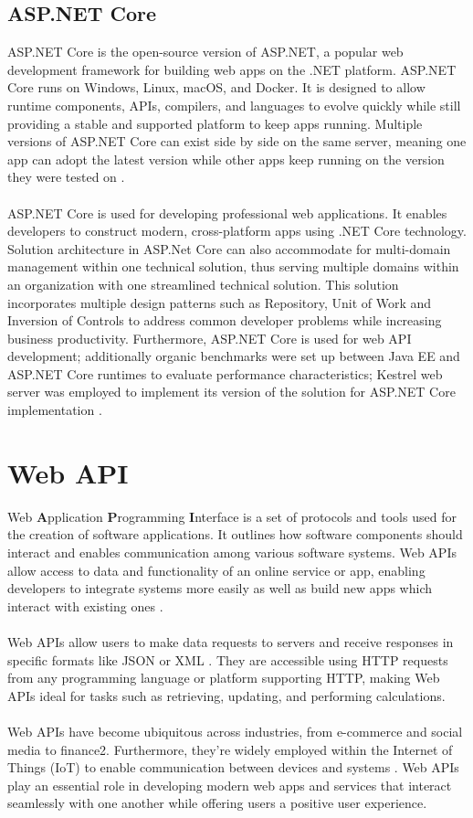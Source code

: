 \documentclass[BIF,Bachelor,nenglish]{twbook}%
\begin{document}
\subsection{ASP.NET Core}
ASP.NET Core is the open-source version of ASP.NET, a popular web development framework for building web apps on the .NET platform. ASP.NET Core runs on Windows, Linux, macOS, and Docker. It is designed to allow runtime components, APIs, compilers, and languages to evolve quickly while still providing a stable and supported platform to keep apps running. Multiple versions of ASP.NET Core can exist side by side on the same server, meaning one app can adopt the latest version while other apps keep running on the version they were tested on \cite{dotnetaspcore}.
\\
\\
ASP.NET Core is used for developing professional web applications. It enables developers to construct modern, cross-platform apps using .NET Core technology. Solution architecture in ASP.Net Core can also accommodate for multi-domain management within one technical solution, thus serving multiple domains within an organization with one streamlined technical solution. This solution incorporates multiple design patterns such as Repository, Unit of Work and Inversion of Controls to address common developer problems while increasing business productivity. Furthermore, ASP.NET Core is used for web API development; additionally organic benchmarks were set up between Java EE and ASP.NET Core runtimes to evaluate performance characteristics; Kestrel web server was employed to implement its version of the solution for ASP.NET Core implementation \cite{kro2018}.

\section{Web API}
Web \textbf{A}pplication \textbf{P}rogramming \textbf{I}nterface is a set of protocols and tools used for the creation of software applications. It outlines how software components should interact and enables communication among various software systems. Web APIs allow access to data and functionality of an online service or app, enabling developers to integrate systems more easily as well as build new apps which interact with existing ones \cite{soh2015}.
\\
\\
Web APIs allow users to make data requests to servers and receive responses in specific formats like JSON or XML \cite{tan2016}. They are accessible using HTTP requests from any programming language or platform supporting HTTP, making Web APIs ideal for tasks such as retrieving, updating, and performing calculations.
\\
\\
Web APIs have become ubiquitous across industries, from e-commerce and social media to finance2. Furthermore, they're widely employed within the Internet of Things (IoT) to enable communication between devices and systems \cite{tan2016}. Web APIs play an essential role in developing modern web apps and services that interact seamlessly with one another while offering users a positive user experience.
\end{document}
